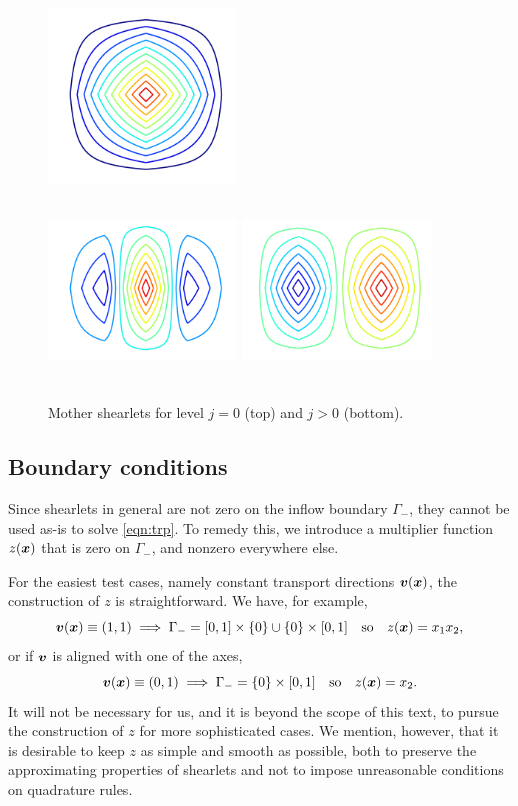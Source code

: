 \begin{figure}
\centering
\includegraphics[width=5cm,height=5cm]{figs/shearlets/newmother0} \\
\includegraphics[width=5cm,height=5cm]{figs/shearlets/newmother1}
\includegraphics[width=5cm,height=5cm]{figs/shearlets/newmother2}
\caption{Mother shearlets for level $j=0$ (top) and $j>0$ (bottom).}
\label{fig:mothers}
\end{figure}

\subsection{Boundary conditions} \label{sec:boundarycond}

Since shearlets in general are not zero on the inflow boundary $\Gamma_-$, they cannot be used as-is to solve
\eqref{eqn:trp}. To remedy this, we introduce a multiplier function $z({\bm x})$ that is zero on $\Gamma_-$, and
nonzero everywhere else.

For the easiest test cases, namely constant transport directions ${\bm v}({\bm x})$, the construction of $z$ is
straightforward. We have, for example,
\[
    {\bm v}({\bm x}) \equiv (1,1) 
    \implies \Gamma_- = [0,1] \times \{0\} \cup \{0\} \times [0,1]
    \quad \text{so} \quad
    z({\bm x}) = x_1 x_2,
\]
or if ${\bm v}$ is aligned with one of the axes,
\[
    {\bm v}({\bm x}) \equiv (0,1)
    \implies \Gamma_- = \{0\} \times [0,1]
    \quad \text{so} \quad
    z({\bm x}) = x_2.
\]
It will not be necessary for us, and it is beyond the scope of this text, to pursue the construction of $z$
for more sophisticated cases. We mention, however, that it is desirable to keep $z$ as simple and smooth as
possible, both to preserve the approximating properties of shearlets and not to impose unreasonable conditions
on quadrature rules.

